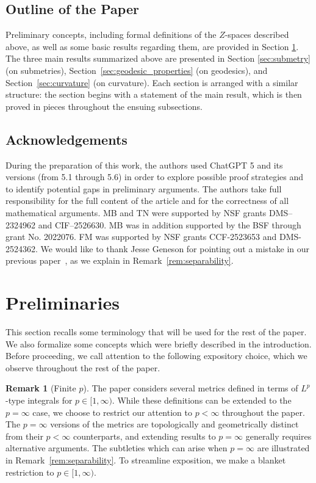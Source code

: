 \documentclass{article}
\theoremstyle{definition}
\newtheorem{remark}[proposition]{Remark}
\begin{document}
\subsection{Outline of the Paper}

Preliminary concepts, including formal definitions of the $Z$-spaces described above, as well as some basic results regarding them, are provided in Section \ref{sec:preliminaries}. The three main results summarized above are presented in Section \ref{sec:submetry} (on submetries), Section~\ref{sec:geodesic_properties} (on geodesics), and Section~\ref{sec:curvature} (on curvature). Each section is arranged with a similar structure: the section begins with a statement of the main result, which is then proved in pieces throughout the ensuing subsections. 

\subsection{Acknowledgements}

During the preparation of this work, the authors used ChatGPT 5 and its versions (from 5.1 through 5.6) in order to explore possible proof strategies and to identify potential gaps in preliminary arguments. The authors  take full responsibility for the full content of the  article and for the correctness of all mathematical arguments. MB and TN were supported by NSF grants DMS--2324962 and CIF--2526630. MB was in addition supported by the BSF through grant No. 2022076. FM was supported by NSF grants CCF-2523653 and DMS-2524362. We would like to thank Jesse Geneson for pointing out a mistake in our previous paper~\cite{bauer2025zgromovwassersteindistance}, as we explain in Remark~\ref{rem:separability}.

\section{Preliminaries}\label{sec:preliminaries}

This section recalls some terminology that will be used for the rest of the paper. We also formalize some concepts which were briefly described in the introduction. Before proceeding, we call attention to the following expository choice, which we observe throughout the rest of the paper.

\begin{remark}[Finite $p$]\label{rem:finite_p}
    The paper considers several metrics defined in terms of $L^p$-type integrals for $p \in [1,\infty)$. While these definitions can be extended to the $p=\infty$ case, we choose to restrict our attention to $p < \infty$ throughout the paper. The $p=\infty$ versions of the metrics are topologically and geometrically distinct from their $p < \infty$ counterparts, and extending results to $p=\infty$ generally requires alternative arguments. The subtleties which can arise when $p=\infty$ are illustrated in Remark~\ref{rem:separability}. To streamline exposition, we make a blanket restriction to $p \in [1,\infty)$. 
\end{remark}
\end{document}
